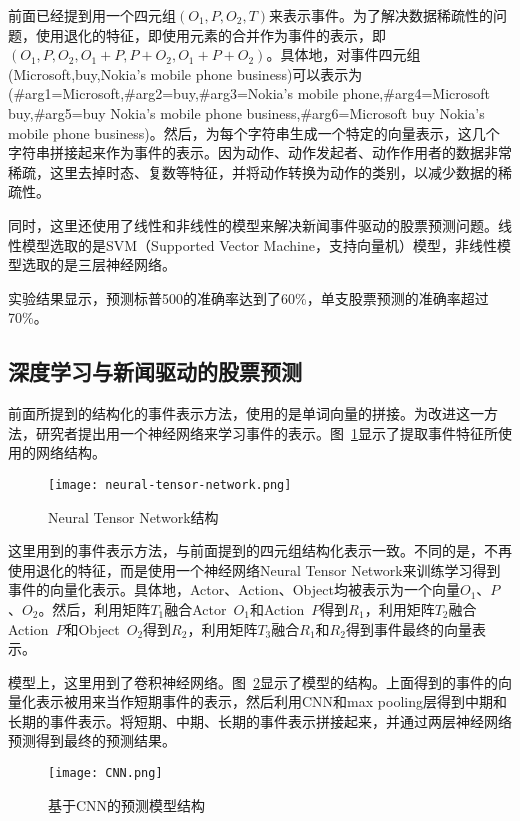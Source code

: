 前面已经提到用一个四元组$(O_1,P,O_2,T)$来表示事件。为了解决数据稀疏性的问题，使用退化的特征，即使用元素的合并作为事件的表示，即$(O_1,P,O_2,O_1+P,P+O_2,O_1+P+O_2)$。具体地，对事件四元组(Microsoft,buy,Nokia's mobile phone business)可以表示为(\#arg1=Microsoft,\#arg2=buy,\#arg3=Nokia's mobile phone,\#arg4=Microsoft buy,\#arg5=buy Nokia's mobile phone business,\#arg6=Microsoft buy Nokia's mobile phone business)。然后，为每个字符串生成一个特定的向量表示，这几个字符串拼接起来作为事件的表示。因为动作、动作发起者、动作作用者的数据非常稀疏，这里去掉时态、复数等特征，并将动作转换为动作的类别，以减少数据的稀疏性。

同时，这里还使用了线性和非线性的模型来解决新闻事件驱动的股票预测问题。线性模型选取的是SVM（Supported Vector Machine，支持向量机）模型，非线性模型选取的是三层神经网络。

实验结果显示，预测标普500的准确率达到了60\%，单支股票预测的准确率超过70\%。

\subsection{深度学习与新闻驱动的股票预测}

前面所提到的结构化的事件表示方法，使用的是单词向量的拼接。为改进这一方法，研究者提出用一个神经网络来学习事件的表示。图~\ref{fig:neural-tensor-network}显示了提取事件特征所使用的网络结构。

\begin{figure}[ht]
    \centering 
    \texttt{[image: neural-tensor-network.png]}
    \caption{Neural Tensor Network结构}
    \label{fig:neural-tensor-network}
\end{figure}

这里用到的事件表示方法，与前面提到的四元组结构化表示一致。不同的是，不再使用退化的特征，而是使用一个神经网络Neural Tensor Network来训练学习得到事件的向量化表示。具体地，Actor、Action、Object均被表示为一个向量$O_1$、$P$、$O_2$。然后，利用矩阵$T_1$融合Actor~$O_1$和Action~$P$得到$R_1$，利用矩阵$T_2$融合Action~$P$和Object~$O_2$得到$R_2$，利用矩阵$T_3$融合$R_1$和$R_2$得到事件最终的向量表示。

模型上，这里用到了卷积神经网络。图~\ref{fig:cnn}显示了模型的结构。上面得到的事件的向量化表示被用来当作短期事件的表示，然后利用CNN和max pooling层得到中期和长期的事件表示。将短期、中期、长期的事件表示拼接起来，并通过两层神经网络预测得到最终的预测结果。

\begin{figure}[ht]
    \centering 
    \texttt{[image: CNN.png]}
    \caption{基于CNN的预测模型结构}
    \label{fig:cnn}
\end{figure}


